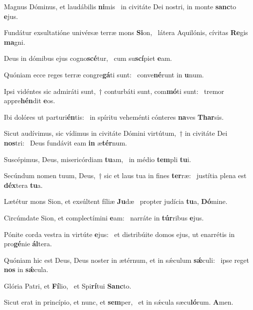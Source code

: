 \item Magnus Dóminus, et laudábilis \textbf{ni}mis~\psstar{} in civitáte Dei nostri, in monte \textbf{sanc}to \textbf{e}jus.
\item Fundátur exsultatióne univérsæ terræ mons \textbf{Si}on,~\psstar{} látera Aquilónis, cívitas \textbf{Re}gis \textbf{ma}gni.
\item Deus in dómibus ejus cogno\textbf{scé}tur,~\psstar{} cum su\textbf{scí}piet \textbf{e}am.
\item Quóniam ecce reges terræ congre\textbf{gá}ti sunt:~\psstar{} conve\textbf{né}runt in \textbf{u}num.
\item Ipsi vidéntes sic admiráti sunt,~† conturbáti sunt, com\textbf{mó}ti sunt:~\psstar{} tremor appre\textbf{hén}dit \textbf{e}os.
\item Ibi dolóres ut parturi\textbf{én}tis:~\psstar{} in spíritu veheménti cónteres \textbf{na}ves \textbf{Thar}sis.
\item Sicut audívimus, sic vídimus in civitáte Dómini virtútum,~† in civitáte Dei \textbf{nos}tri:~\psstar{} Deus fundávit eam \textbf{in} æ\textbf{tér}num.
\item Suscépimus, Deus, misericórdiam \textbf{tu}am,~\psstar{} in médio \textbf{tem}pli \textbf{tu}i.
\item Secúndum nomen tuum, Deus,~† sic et laus tua in fines \textbf{ter}ræ:~\psstar{} justítia plena est \textbf{déx}tera \textbf{tu}a.
\item Lætétur mons Sion, et exsúltent fíliæ \textbf{Ju}dæ~\psstar{} propter judícia \textbf{tu}a, \textbf{Dó}mine.
\item Circúmdate Sion, et complectímini \textbf{e}am:~\psstar{} narráte in \textbf{túr}ribus \textbf{e}jus.
\item Pónite corda vestra in virtúte \textbf{e}jus:~\psstar{} et distribúite domos ejus, ut enarrétis in pro\textbf{gé}nie \textbf{ál}tera.
\item Quóniam hic est Deus, Deus noster in ætérnum, et in sǽculum \textbf{sǽ}culi:~\psstar{} ipse reget \textbf{nos} in \textbf{sǽ}cula.
\item Glória Patri, et \textbf{Fí}lio,~\psstar{} et Spi\textbf{rí}tui \textbf{Sanc}to.
\item Sicut erat in princípio, et nunc, et \textbf{sem}per,~\psstar{} et in sǽcula sæcu\textbf{ló}rum. \textbf{A}men.
